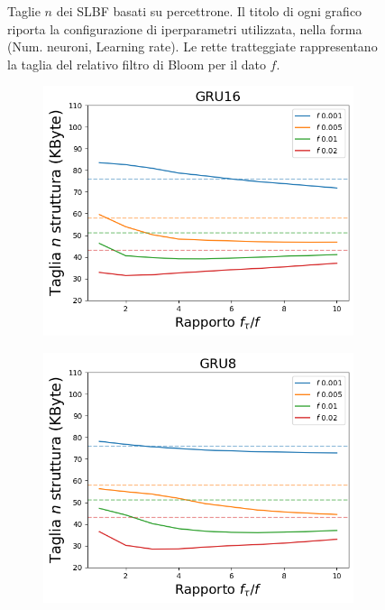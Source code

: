 \documentclass[../../main.tex]{subfiles}
\begin{document}
\begin{figure}[H]
\begin{subfigure}[b]{0.49\textwidth}
            \caption{}
            \label{fig:SLBFTagliaPercettrone30}
        \end{subfigure}
        \caption{Taglie $n$ dei SLBF basati su percettrone. Il titolo di ogni grafico riporta la configurazione di iperparametri utilizzata, nella forma (Num. neuroni, Learning rate). Le rette tratteggiate rappresentano la taglia del relativo filtro di Bloom per il dato $f$.}
        \label{fig:tagliePercettroniSLBF}
    \end{figure}

    \begin{figure}[H]
        \centering
        \begin{subfigure}[b]{0.49\textwidth}
            \centering
            \includegraphics[width = \textwidth]{immagini/7/SLBF/GRU16_Taglia.png}
            \caption{}
            \label{fig:SLBFTagliaGRU16}
        \end{subfigure}
        \begin{subfigure}[b]{0.49\textwidth}
            \centering
            \includegraphics[width = \textwidth]{immagini/7/SLBF/GRU8_Taglia.png}

\end{subfigure}
\end{figure}
\end{document}
